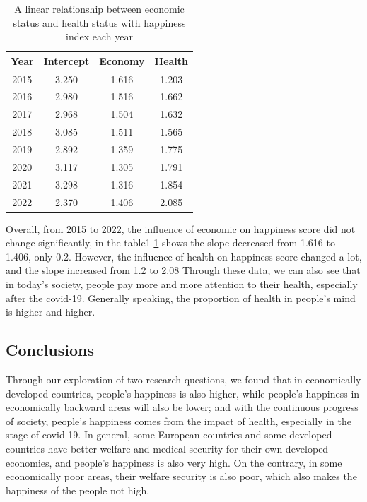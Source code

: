 \documentclass[11pt,a4paper,]{article}
\begin{document}
\begin{table}
\centering
\begin{tabular}{|c|c|c|c|}
\hline
\textbf{Year} & \textbf{Intercept} & \textbf{Economy} & \textbf{Health} \\
\hline
2015          & 3.250              & 1.616            & 1.203           \\
2016          & 2.980              & 1.516            & 1.662           \\
2017          & 2.968              & 1.504            & 1.632           \\
2018          & 3.085              & 1.511            & 1.565           \\
2019          & 2.892              & 1.359            & 1.775           \\
2020          & 3.117              & 1.305            & 1.791           \\
2021          & 3.298              & 1.316            & 1.854           \\
2022          & 2.370              & 1.406            & 2.085           \\
\hline
\end{tabular}
\caption{A linear relationship between economic status and health status with happiness index each year}
\label{tab:table}
\end{table}

Overall, from 2015 to 2022, the influence of economic on happiness score did not change significantly, in the table1 \ref{tab:table} shows the slope decreased from 1.616 to 1.406, only 0.2. However, the influence of health on happiness score changed a lot, and the slope increased from 1.2 to 2.08 Through these data, we can also see that in today's society, people pay more and more attention to their health, especially after the covid-19. Generally speaking, the proportion of health in people's mind is higher and higher.

\hypertarget{conclusions}{%
\subsection{Conclusions}\label{conclusions}}

Through our exploration of two research questions, we found that in economically developed countries, people's happiness is also higher, while people's happiness in economically backward areas will also be lower; and with the continuous progress of society, people's happiness comes from the impact of health, especially in the stage of covid-19. In general, some European countries and some developed countries have better welfare and medical security for their own developed economies, and people's happiness is also very high. On the contrary, in some economically poor areas, their welfare security is also poor, which also makes the happiness of the people not high.
\end{document}
